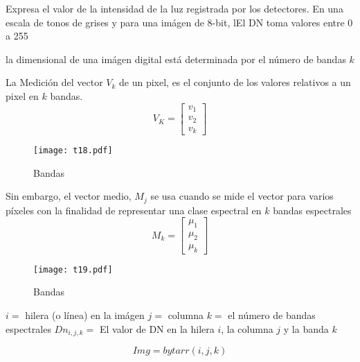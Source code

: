 \begin{definition}
    Expresa el valor de la intensidad de la luz registrada por los detectores. En una escala de tonos de grises y para una imágen de 8-bit, lEl DN toma valores entre 0 a 255
\end{definition}

\begin{definition}[Dimensional]
    la dimensional de una imágen digital está determinada por el número de bandas $k$
\end{definition}

La Medición del vector $V_k$ de un pixel, es el conjunto de los valores relativos a un pixel en $k$ bandas.
\begin{equation}
    V_K =\begin{bmatrix} 
        v_1\\v_2\\ v_k
     \end{bmatrix}
\end{equation}

\begin{figure}[h!]
\centering
  \texttt{[image: t18.pdf]}
  \caption{Bandas}
  \label{t18}
\end{figure}

Sin embargo, el vector medio, $M_j$ se usa cuando se mide el vector para varios píxeles con la finalidad de representar una clase espectral en $k$ bandas espectrales
\begin{equation}
    M_k =\begin{bmatrix}
        \mu_1\\\mu_2\\\mu_k
    \end{bmatrix}
\end{equation}


\begin{figure}[h!]
    \centering
      \texttt{[image: t19.pdf]}
      \caption{Bandas}
      \label{t19}
    \end{figure}

    \begin{notation}
      $i=$ hilera (o línea) en la imágen
      $j=$ columna
      $k=$ el número de bandas espectrales
      $Dn_{i,j,k}=$ El valor de DN en la hilera $i$, la columna $j$ y la banda $k$
  \end{notation}
  \begin{equation}
      Img = bytarr(i,j,k)
  \end{equation}
  
